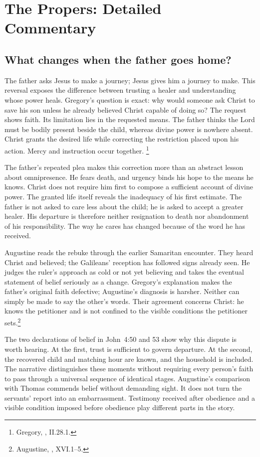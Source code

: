 \section{The Propers: Detailed Commentary}

\subsection{What changes when the father goes home?}
The father asks Jesus to make a journey; Jesus gives him a journey to
make. This reversal exposes the difference between trusting a healer
and understanding whose power heals. Gregory's question is exact: why
would someone ask Christ to save his son unless he already believed
Christ capable of doing so? The request shows faith. Its limitation
lies in the requested means. The father thinks the Lord must be bodily
present beside the child, whereas divine power is nowhere absent.
Christ grants the desired life while correcting the restriction placed
upon his action. Mercy and instruction occur together.
\footnote{Gregory, , II.28.1.}

The father's repeated plea makes this correction more than an abstract
lesson about omnipresence. He fears death, and urgency binds his hope
to the means he knows. Christ does not require him first to compose
a sufficient account of divine power. The granted life itself reveals
the inadequacy of his first estimate. The father is not asked to care
less about the child; he is asked to accept a greater healer. His
departure is therefore neither resignation to death nor abandonment
of his responsibility. The way he cares has changed because of the
word he has received.

Augustine reads the rebuke through the earlier Samaritan encounter.
They heard Christ and believed; the Galileans' reception has followed
signs already seen. He judges the ruler's approach as cold or not yet
believing and takes the eventual statement of belief seriously as a
change. Gregory's explanation makes the father's original faith
defective; Augustine's diagnosis is harsher. Neither can simply be
made to say the other's words. Their agreement concerns Christ: he
knows the petitioner and is not confined to the visible conditions the
petitioner sets.\footnote{Augustine, , XVI.1--5.}

The two declarations of belief in John~4:50 and 53 show why this dispute
is worth hearing. At the first, trust is sufficient to govern departure.
At the second, the recovered child and matching hour are known, and the
household is included. The narrative distinguishes these moments without
requiring every person's faith to pass through a universal sequence of
identical stages. Augustine's comparison with Thomas commends belief
without demanding sight. It does not turn the servants' report into
an embarrassment. Testimony received after obedience and a visible
condition imposed before obedience play different parts in the story.

